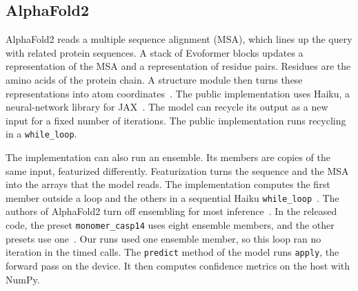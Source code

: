 \subsection{AlphaFold2}\label{sec:bg-af2}
AlphaFold2 reads a multiple sequence alignment (MSA), which lines up the query with related protein sequences. A stack
of Evoformer blocks updates a representation of the MSA and a representation of residue pairs. Residues are the amino
acids of the protein chain. A structure module then turns these representations into atom
coordinates~\cite{jumper2021alphafold}. The public implementation uses Haiku, a neural-network library for
JAX~\cite{haiku2020github}. The
model can recycle its output as a new input for a fixed number of
iterations. The public implementation runs recycling in a \texttt{while\_loop}.

The implementation can also run an ensemble. Its members are copies of the same input, featurized differently.
Featurization turns the sequence and the MSA into the arrays that the model reads. The implementation computes the
first member outside a loop and the others in a sequential Haiku \texttt{while\_loop}~\cite{alphafoldrepo}. %
The authors of AlphaFold2 turn off ensembling for most inference~\cite{jumper2021alphafold}. In the released code, the
preset \texttt{monomer\_casp14} uses eight ensemble members, and the other presets use one~\cite{alphafoldrepo}. %
Our runs used one ensemble member, so this loop ran no iteration in the timed calls. %
The \texttt{predict} method of the model runs \texttt{apply}, the forward pass on the device. It then computes
confidence metrics on the host with NumPy.
